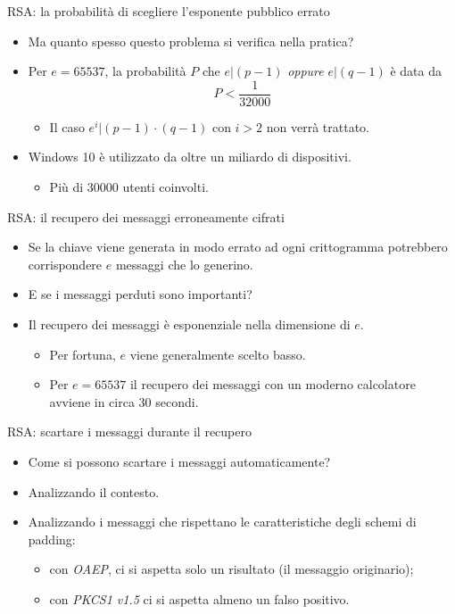 \documentclass[11pt,svgnames,smaller,aspectratio=169,italian]{beamer}
\begin{document}
\begin{frame}{RSA: la probabilità di scegliere l'esponente pubblico errato}
	\begin{itemize}
		\item Ma quanto spesso questo problema si verifica nella pratica?
		\item Per $e = 65537$, la probabilità $P$ che $e | (p - 1)$ \emph{oppure} $e | (q - 1)$ è data da
			\begin{equation*}
				P < \frac{1}{32000}
			\end{equation*}
			\begin{itemize}
				\item Il caso $e^{i} | (p - 1) \cdot (q - 1)$ con $i > 2$ non verrà trattato.
			\end{itemize}
		\item Windows 10 è utilizzato da oltre un miliardo di dispositivi.
			\begin{itemize}
				\item Più di 30000 utenti coinvolti.
			\end{itemize}
	\end{itemize}
\end{frame}

\begin{frame}{RSA: il recupero dei messaggi erroneamente cifrati}
	\begin{itemize}
		\item Se la chiave viene generata in modo errato ad ogni crittogramma potrebbero corrispondere $e$ messaggi che lo generino.
		\item E se i messaggi perduti sono importanti?
		\item Il recupero dei messaggi è esponenziale nella dimensione di $e$.
			\begin{itemize}
				\item Per fortuna, $e$ viene generalmente scelto basso.
				\item Per $e = 65537$ il recupero dei messaggi con un moderno calcolatore avviene in circa 30 secondi.
			\end{itemize}
	\end{itemize}
\end{frame}

\begin{frame}{RSA: scartare i messaggi durante il recupero}
	\begin{itemize}
		\item Come si possono scartare i messaggi automaticamente?
		\item Analizzando il contesto.
		\item Analizzando i messaggi che rispettano le caratteristiche degli schemi di padding:
			\begin{itemize}
				\item con \emph{OAEP}, ci si aspetta solo un risultato (il messaggio originario);
				\item con \emph{PKCS1 v1.5} ci si aspetta almeno un falso positivo.
			\end{itemize}
	\end{itemize}
\end{frame}
\end{document}
